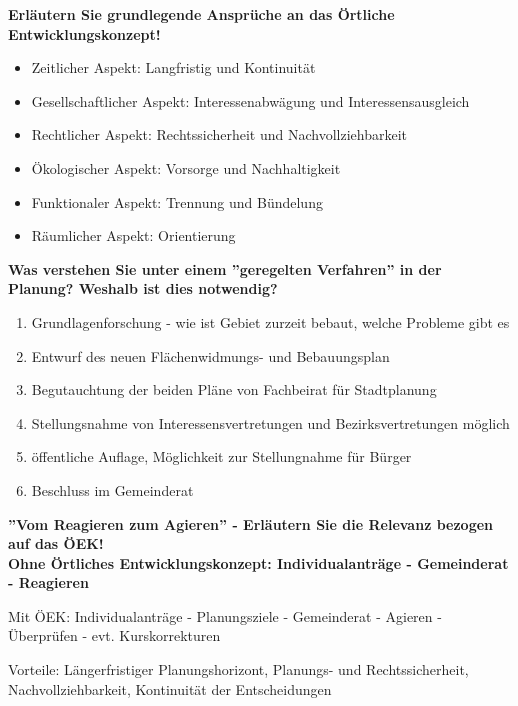 \documentclass[]{article}
\newenvironment{question}{\vspace{8mm}\noindent\bfseries}{\\}
\begin{document}
\begin{question}
	Erläutern Sie grundlegende Ansprüche an das Örtliche Entwicklungskonzept!
\end{question}
\begin{itemize}
	\item Zeitlicher Aspekt: Langfristig und Kontinuität
	\item Gesellschaftlicher Aspekt: Interessenabwägung und Interessensausgleich
	\item Rechtlicher Aspekt: Rechtssicherheit und Nachvollziehbarkeit
	\item Ökologischer Aspekt: Vorsorge und Nachhaltigkeit
	\item Funktionaler Aspekt: Trennung und Bündelung
	\item Räumlicher Aspekt: Orientierung
\end{itemize}
	

\begin{question}
	Was verstehen Sie unter einem ''geregelten Verfahren'' in der Planung? Weshalb ist dies notwendig?
\end{question}
\begin{enumerate}
	\item Grundlagenforschung - wie ist Gebiet zurzeit bebaut, welche Probleme gibt es
	\item Entwurf des neuen Flächenwidmungs- und Bebauungsplan
	\item Begutauchtung der beiden Pläne von Fachbeirat für Stadtplanung
	\item Stellungsnahme von Interessensvertretungen und Bezirksvertretungen möglich
	\item öffentliche Auflage, Möglichkeit zur Stellungnahme für Bürger
	\item Beschluss im Gemeinderat
\end{enumerate}


\begin{question}
	''Vom Reagieren zum Agieren'' - Erläutern Sie die Relevanz bezogen auf das ÖEK!
\end{question}
Ohne Örtliches Entwicklungskonzept: Individualanträge - Gemeinderat - Reagieren

Mit ÖEK: Individualanträge - Planungsziele - Gemeinderat - Agieren - Überprüfen - evt. Kurskorrekturen

Vorteile: Längerfristiger Planungshorizont, Planungs- und Rechtssicherheit, Nachvollziehbarkeit, Kontinuität der Entscheidungen
\end{document}
